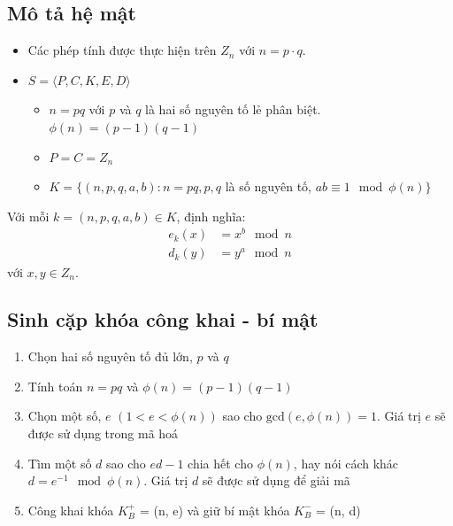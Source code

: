 \documentclass{article}
\begin{document}
\subsection{Mô tả hệ mật}

\begin{itemize}
    \item Các phép tính được thực hiện trên $Z_n$ với $n = p \cdot q$.
    \item $S = \langle P, C, K, E, D \rangle$
    \begin{itemize}
        \item $n = pq$ với $p$ và $q$ là hai số nguyên tố lẻ phân biệt. $\phi(n) = (p-1)(q-1)$
        \item $P = C = Z_n$
        \item $K = \{ (n, p, q, a, b) : n = pq, p, q$ là số nguyên tố, $ab \equiv 1 \mod \phi(n) \}$
    \end{itemize}
\end{itemize}

Với mỗi $k = (n, p, q, a, b) \in K$, định nghĩa:
\begin{align*}
    e_k(x) &= x^b \mod n \\
    d_k(y) &= y^a \mod n
\end{align*}
với $x, y \in Z_n$.




\subsection{Sinh cặp khóa công khai - bí mật}

\begin{enumerate}
    \item   Chọn hai số nguyên tố đủ lớn, $p$ và $q$ 
    \item    Tính toán $n = pq$ và $\phi(n) = (p - 1)(q - 1)$ 
    \item     Chọn một số, $e$ $(1 < e < \phi(n))$ sao cho $\text{gcd}(e, \phi(n)) = 1$. Giá trị $e$ sẽ được sử dụng trong mã hoá
    \item     Tìm một số $d$ sao cho $ed - 1$ chia hết cho $\phi(n)$, hay nói cách khác $d = e^{-1} \mod \phi(n)$. Giá trị $d$ sẽ được sử dụng để giải mã 
    \item     Công khai khóa $K^+_B$  = (n, e)  và giữ bí mật khóa $K^-_B$  = (n, d) 
\end{enumerate}
\end{document}
